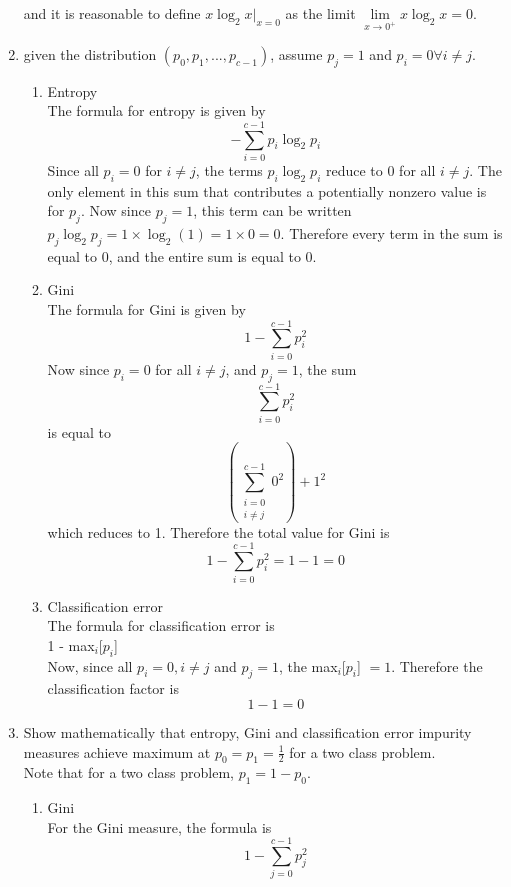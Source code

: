 \documentclass[11pt]{article}
\begin{document}
\begin{enumerate}
    and it is reasonable to define $x \log_2 x \left.\right|_{x = 0}$ as the limit 
    $\lim\limits_{x \to 0^+} x \log_2 x = 0$.  
  \item given the distribution $(p_0, p_1, ... , p_{c - 1})$, assume $p_j = 1$ and $p_i = 0 \forall i \neq j$. 
     \begin{enumerate}
       \item Entropy\\
         The formula for entropy is given by 
         $$- \sum \limits_{i = 0}^{c - 1} p_i \log_2 p_i$$ 
         Since all $p_i = 0$ for $i \ne j$, the terms $p_i \log_2 p_i$ reduce to 0 for all $i \ne j$. 
         The only element in this sum that contributes a potentially nonzero value is for $p_j$. 
         Now since $p_j = 1$, this term can be written $ p_j \log_2 p_j = 1\times\log_2(1) = 1 \times 0 = 0$. 
         Therefore every term in the sum is equal to 0, and the entire sum is equal to 0. 
       \item Gini\\
         The formula for Gini is given by 
         $$1 - \sum\limits_{i = 0}^{c - 1} p_i^2$$
         Now since $p_i = 0$ for all $i \ne j$, and $p_j = 1$, the sum 
         $$\sum\limits_{i = 0}^{c - 1} p_i^2$$ is equal to 
         $$\left(\sum\limits_{\substack{i = 0\\ i \ne j}}^{c - 1} 0^2\right) + 1^2$$
         which reduces to 1. 
         Therefore the total value for Gini is 
         $$ 1 - \sum\limits_{i = 0}^{c - 1} p_i^2 = 1 - 1 = 0$$
       \item Classification error\\
         The formula for classification error is 
         \\
         1 - max$_i$[$p_i$]
         \\
         Now, since all $p_i = 0, i \ne j$ and $p_j = 1$, the max$_i$[$p_i$] $= 1$. Therefore the classification factor is 
         $$1 - 1 = 0$$
      \end{enumerate}
    \item Show mathematically that entropy, Gini and classification error impurity measures achieve maximum at $p_0 = p_1 = \frac{1}{2}$ 
          for a two class problem.\\
          Note that for a two class problem, $p_1 = 1 - p_0$. 
          \begin{enumerate}
            \item Gini\\
                 For the Gini measure, the formula is $$ 1 - \sum\limits_{j = 0}^{c - 1} p_j^2$$

\end{enumerate}
\end{enumerate}
\end{document}
